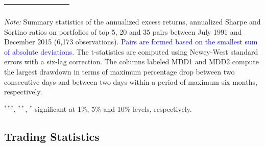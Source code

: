 \documentclass[pdf,9pt,xcolor=dvipsnames,hide notes]{beamer}
\begin{document}
\begin{frame}
\begin{threeparttable}[H]
\begin{tabularx}{\textwidth}{@{\extracolsep{\fill}}llllllll@{}}
			\multicolumn{1}{r}{} & \multicolumn{1}{r}{} & \multicolumn{1}{r}{} & \multicolumn{1}{r}{} & \multicolumn{1}{r}{} & \multicolumn{1}{r}{} & \multicolumn{1}{r}{} & \multicolumn{1}{r}{} \\
			\bottomrule
		\end{tabularx}%
		\begin{tablenotes}
			\item \textit{Note:} \tiny Summary statistics of the annualized excess returns, annualized Sharpe and Sortino ratios on portfolios of top 5, 20 and 35 pairs between July 1991 and December 2015 (6,173 observations). \textcolor{blue}{Pairs are formed based on the smallest sum of absolute deviations}. The t-statistics are computed using Newey-West standard errors with a six-lag correction. The columns labeled MDD1 and MDD2 compute the largest drawdown in terms of maximum percentage drop between two consecutive days and between two days within a period of maximum six months, respectively.
			\item \scriptsize $^{\ast\ast\ast}$, $^{\ast\ast}$, $^{\ast}$  significant at 1\%, 5\% and 10\% levels, respectively.
		\end{tablenotes}
		\label{tab:table104}%
	\end{threeparttable}%
	
	
\end{frame}

\subsection{Trading Statistics}
\end{document}
